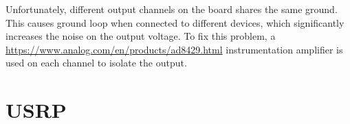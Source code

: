 Unfortunately, different output channels on the board shares the same ground.
This causes ground loop when connected to different devices,
which significantly increases the noise on the output voltage.
To fix this problem, a \href{AD8429}{https://www.analog.com/en/products/ad8429.html}
instrumentation amplifier is used on each channel to isolate the output.

\section{USRP}
\label{appendex:computer-control:usrp}

